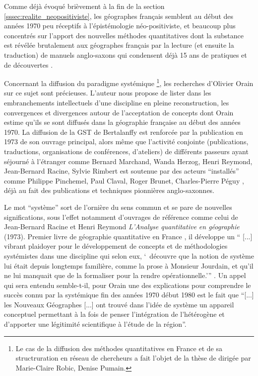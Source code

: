 
Comme déjà évoqué brièvement à la fin de la section \ref{sssec:realite_neopositiviste}, les géographes français semblent au début des années 1970 peu réceptifs à l'épistémologie néo-positiviste, et beaucoup plus concentrés sur l'apport des nouvelles méthodes quantitatives dont la substance est révélée brutalement aux géographes français par la lecture (et ensuite la traduction) de manuels anglo-saxons qui condensent déjà 15 ans de pratiques et de découvertes \autocite[129]{Pumain2002}.

Concernant la diffusion du paradigme systémique \footnote{Le cas de la diffusion des méthodes quantitatives en France et de sa structruration en réseau de chercheurs a fait l'objet de la thèse de \textcite{Cuyala2014} dirigée par Marie-Claire Robic, Denise Pumain.}, les recherches d'Olivier Orain \autocite{Orain2001} sur ce sujet sont précieuses. L'auteur nous propose de lister dans les embranchements intellectuels d'une discipline en pleine reconstruction, les convergences et divergences autour de l'acceptation de concepts dont Orain estime qu'ils se sont diffusés dans la géographie française au début des années 1970. La diffusion de la GST de Bertalanffy est renforcée par la publication en 1973 de son ouvrage principal, alors même que l'activité conjointe (publications, traductions, organisations de conférences, d'ateliers) de différents passeurs ayant séjourné à l'étranger comme Bernard Marchand, Wanda Herzog, Henri Reymond, Jean-Bernard Racine, Sylvie Rimbert est soutenue par des acteurs \enquote{installés} comme Philippe Pinchemel, Paul Claval, Roger Brunet, Charles-Pierre Péguy \autocite{Pumain2002,Cauvin2007}, déjà au fait des publications et techniques pionnières anglo-saxonnes.


Le mot \enquote{système} sort de l'ornière du sens commun et se pare de nouvelles significations, sous l'effet notamment d'ouvrages de référence comme celui de Jean-Bernard Racine et Henri Reymond  \textit{L’Analyse quantitative en géographie} (1973). Premier livre de géographie quantitative en France \autocite{Cauvin2007}, il développe un \enquote{ [...] vibrant plaidoyer pour le développement de concepts et de méthodologies systémistes dans une discipline qui selon eux, \enquote{ découvre que la notion de système lui était depuis longtemps familière, comme la prose à Monsieur Jourdain, et qu'il ne lui manquait que de la formaliser pour la rendre opérationnelle.}} \textcite{Orain2001}. Un appel qui sera entendu semble-t-il, pour Orain \autocite[23]{Orain2001} une des explications pour comprendre le succès connu par la systémique fin des années 1970 début 1980 est le fait que \enquote{[...] les Nouveaux Géographes [...] ont trouvé dans l’idée de système un appareil conceptuel permettant à la fois de penser l’intégration de l’hétérogène et d’apporter une légitimité scientifique à l’étude de la région}.

